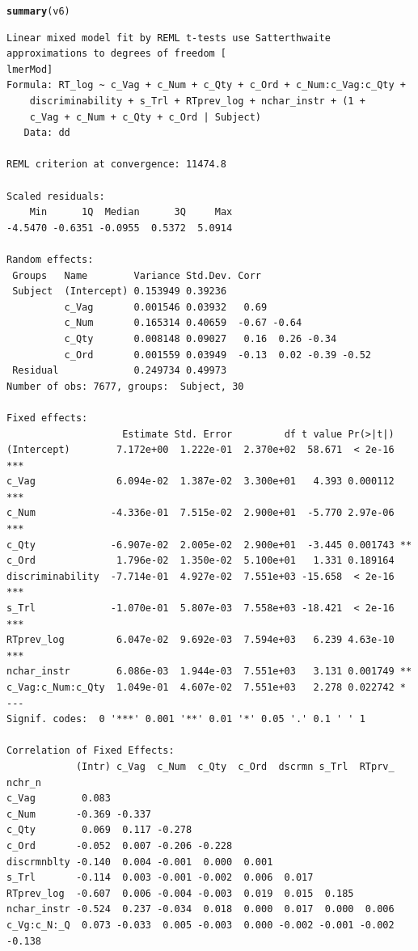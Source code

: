 \documentclass[a4paper,12pt,twoside]{article}\usepackage[]{graphicx}\usepackage[]{color}
\makeatletter
\newcommand{\hlstd}[1]{\textcolor[rgb]{0.345,0.345,0.345}{#1}}%
\newcommand{\hlkwd}[1]{\textcolor[rgb]{0.737,0.353,0.396}{\textbf{#1}}}%
\newenvironment{kframe}{%
 \def\at@end@of@kframe{}%
 \ifinner\ifhmode%
  \def\at@end@of@kframe{\end{minipage}}%
  \begin{minipage}{\columnwidth}%
 \fi\fi%
 \def\FrameCommand##1{\hskip\@totalleftmargin \hskip-\fboxsep
 \colorbox{shadecolor}{##1}\hskip-\fboxsep
     \hskip-\linewidth \hskip-\@totalleftmargin \hskip\columnwidth}%
 \MakeFramed {\advance\hsize-\width
   \@totalleftmargin\z@ \linewidth\hsize
   \@setminipage}}%
 {\par\unskip\endMakeFramed%
 \at@end@of@kframe}
\newenvironment{knitrout}{}{} %
\makeatother
\begin{document}
\begin{knitrout}\scriptsize
{}\color{fgcolor}\begin{kframe}
\begin{alltt}
\hlkwd{summary}\hlstd{(v6)}
\end{alltt}
\begin{verbatim}
Linear mixed model fit by REML t-tests use Satterthwaite approximations to degrees of freedom [
lmerMod]
Formula: RT_log ~ c_Vag + c_Num + c_Qty + c_Ord + c_Num:c_Vag:c_Qty +  
    discriminability + s_Trl + RTprev_log + nchar_instr + (1 +  
    c_Vag + c_Num + c_Qty + c_Ord | Subject)
   Data: dd

REML criterion at convergence: 11474.8

Scaled residuals: 
    Min      1Q  Median      3Q     Max 
-4.5470 -0.6351 -0.0955  0.5372  5.0914 

Random effects:
 Groups   Name        Variance Std.Dev. Corr                   
 Subject  (Intercept) 0.153949 0.39236                         
          c_Vag       0.001546 0.03932   0.69                  
          c_Num       0.165314 0.40659  -0.67 -0.64            
          c_Qty       0.008148 0.09027   0.16  0.26 -0.34      
          c_Ord       0.001559 0.03949  -0.13  0.02 -0.39 -0.52
 Residual             0.249734 0.49973                         
Number of obs: 7677, groups:  Subject, 30

Fixed effects:
                    Estimate Std. Error         df t value Pr(>|t|)    
(Intercept)        7.172e+00  1.222e-01  2.370e+02  58.671  < 2e-16 ***
c_Vag              6.094e-02  1.387e-02  3.300e+01   4.393 0.000112 ***
c_Num             -4.336e-01  7.515e-02  2.900e+01  -5.770 2.97e-06 ***
c_Qty             -6.907e-02  2.005e-02  2.900e+01  -3.445 0.001743 ** 
c_Ord              1.796e-02  1.350e-02  5.100e+01   1.331 0.189164    
discriminability  -7.714e-01  4.927e-02  7.551e+03 -15.658  < 2e-16 ***
s_Trl             -1.070e-01  5.807e-03  7.558e+03 -18.421  < 2e-16 ***
RTprev_log         6.047e-02  9.692e-03  7.594e+03   6.239 4.63e-10 ***
nchar_instr        6.086e-03  1.944e-03  7.551e+03   3.131 0.001749 ** 
c_Vag:c_Num:c_Qty  1.049e-01  4.607e-02  7.551e+03   2.278 0.022742 *  
---
Signif. codes:  0 '***' 0.001 '**' 0.01 '*' 0.05 '.' 0.1 ' ' 1

Correlation of Fixed Effects:
            (Intr) c_Vag  c_Num  c_Qty  c_Ord  dscrmn s_Trl  RTprv_ nchr_n
c_Vag        0.083                                                        
c_Num       -0.369 -0.337                                                 
c_Qty        0.069  0.117 -0.278                                          
c_Ord       -0.052  0.007 -0.206 -0.228                                   
discrmnblty -0.140  0.004 -0.001  0.000  0.001                            
s_Trl       -0.114  0.003 -0.001 -0.002  0.006  0.017                     
RTprev_log  -0.607  0.006 -0.004 -0.003  0.019  0.015  0.185              
nchar_instr -0.524  0.237 -0.034  0.018  0.000  0.017  0.000  0.006       
c_Vg:c_N:_Q  0.073 -0.033  0.005 -0.003  0.000 -0.002 -0.001 -0.002 -0.138
\end{verbatim}
\end{kframe}
\end{knitrout}
\end{document}

